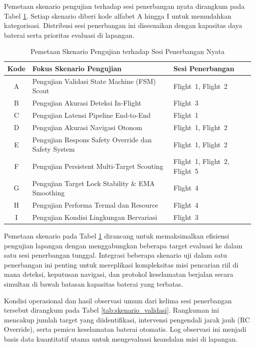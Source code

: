 Pemetaan skenario pengujian terhadap sesi penerbangan nyata dirangkum pada Tabel \ref{tab:pemetaan_skenario}. Setiap skenario diberi kode alfabet A hingga I untuk memudahkan kategorisasi. Distribusi sesi penerbangan ini disesuaikan dengan kapasitas daya baterai serta prioritas evaluasi di lapangan.

\begin{table}[H]
	\centering
	\caption{Pemetaan Skenario Pengujian terhadap Sesi Penerbangan Nyata}
	\label{tab:pemetaan_skenario}
	\renewcommand{\arraystretch}{1.2}
	\begin{tabular}{|c|p{7cm}|p{4cm}|}
		\hline
		\textbf{Kode} & \textbf{Fokus Skenario Pengujian} & \textbf{Sesi Penerbangan} \\ \hline
		A & Pengujian Validasi State Machine (FSM) Scout & Flight~1, Flight~2 \\ \hline
		B & Pengujian Akurasi Deteksi In-Flight & Flight~3 \\ \hline
		C & Pengujian Latensi Pipeline End-to-End & Flight~1 \\ \hline
		D & Pengujian Akurasi Navigasi Otonom & Flight~1, Flight~2 \\ \hline
		E & Pengujian Respons Safety Override dan Safety System & Flight~1, Flight~2 \\ \hline
		F & Pengujian Persistent Multi-Target Scouting & Flight~1, Flight~2, Flight~5 \\ \hline
		G & Pengujian Target Lock Stability \& EMA Smoothing & Flight~4 \\ \hline
		H & Pengujian Performa Termal dan Resource & Flight~4 \\ \hline
		I & Pengujian Kondisi Lingkungan Bervariasi & Flight~3 \\ \hline
	\end{tabular}
\end{table}

Pemetaan skenario pada Tabel \ref{tab:pemetaan_skenario} dirancang untuk memaksimalkan efisiensi pengujian lapangan dengan menggabungkan beberapa target evaluasi ke dalam satu sesi penerbangan tunggal. Integrasi beberapa skenario uji dalam satu penerbangan ini penting untuk mereplikasi kompleksitas misi pencarian riil di mana deteksi, keputusan navigasi, dan protokol keselamatan berjalan secara simultan di bawah batasan kapasitas baterai yang terbatas.

Kondisi operasional dan hasil observasi umum dari kelima sesi penerbangan tersebut dirangkum pada Tabel \ref{tab:skenario_validasi}. Rangkuman ini mencakup jumlah target yang diidentifikasi, intervensi pengendali jarak jauh (RC Override), serta pemicu keselamatan baterai otomatis. Log observasi ini menjadi basis data kuantitatif utama untuk mengevaluasi keandalan misi di lapangan.

